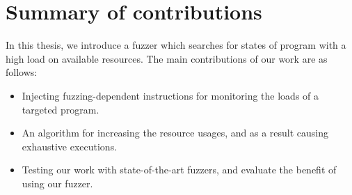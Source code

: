 \section{Summary of contributions}
\label{sec:1.2}

In this thesis, we introduce a fuzzer which searches for states of program with a high load on available resources. The main contributions of our work are as follows:

\begin{itemize}
    \item Injecting fuzzing-dependent instructions for monitoring the loads of a targeted program.
    \item An algorithm for increasing the resource usages, and as a result causing exhaustive executions.
    \item Testing our work with state-of-the-art fuzzers, and evaluate the benefit of using our fuzzer. 
\end{itemize}